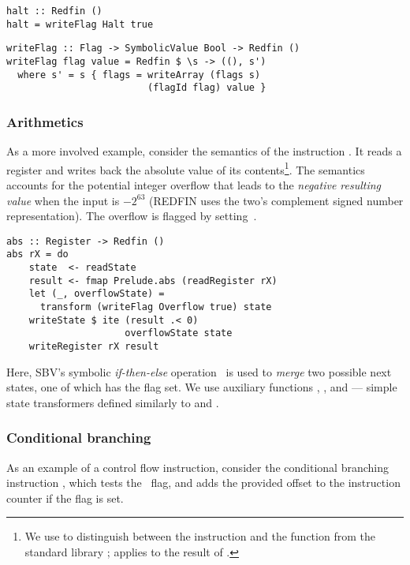 \begin{verbatim}
halt :: Redfin ()
halt = writeFlag Halt true
\end{verbatim}

\begin{verbatim}
writeFlag :: Flag -> SymbolicValue Bool -> Redfin ()
writeFlag flag value = Redfin $ \s -> ((), s')
  where s' = s { flags = writeArray (flags s)
                         (flagId flag) value }
\end{verbatim}



\subsubsection{Arithmetics}
As a more involved example, consider the semantics of the instruction .
It reads a register and writes back the absolute value of its
contents\footnote{We use  to distinguish between the instruction
and the function from the standard library ;  applies
 to the result of .}.
The semantics accounts for the potential integer overflow that leads to the
\emph{negative resulting value} when the input is $-2^{63}$ (REDFIN
uses the two's complement signed number representation). The overflow is flagged
by setting~.


\begin{verbatim}
abs :: Register -> Redfin ()
abs rX = do
    state  <- readState
    result <- fmap Prelude.abs (readRegister rX)
    let (_, overflowState) =
      transform (writeFlag Overflow true) state
    writeState $ ite (result .< 0)
                     overflowState state
    writeRegister rX result
\end{verbatim}


\noindent
Here, SBV's symbolic \emph{if-then-else} operation~ is used to \emph{merge}
two possible next states, one of which has the  flag set. We use
auxiliary functions , ,  and
 --- simple state transformers defined similarly to
 and .


\subsubsection{Conditional branching}
As an example of a control flow instruction, consider the conditional branching
instruction , which tests the~ flag, and adds the
provided offset to the instruction counter if the flag is set.


